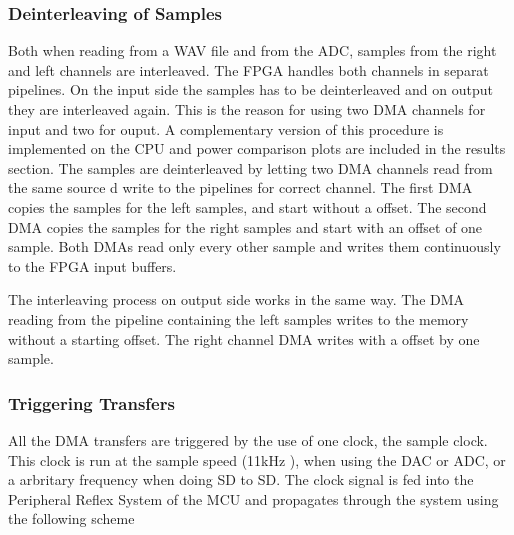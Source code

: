 \subsubsection{Deinterleaving of Samples}

Both when reading from a WAV file and from the ADC, samples from the
right and left channels are interleaved. The FPGA handles both channels in separat
pipelines. On the input side the samples has to be deinterleaved and on output they
are interleaved again. This is the reason for using two DMA channels for input and 
two for ouput. A complementary version of this procedure is implemented on the CPU 
and power comparison plots are included in the results section.  
The samples are deinterleaved by letting two DMA channels read from the same source d write to 
the pipelines for correct channel. The first DMA copies the samples for the left samples,
and start without a offset. The second DMA copies the samples for the right samples and 
start with an offset of one sample. Both DMAs read only every other sample and writes them
continuously to the FPGA input buffers. 

The interleaving process on output side works in the same way. The DMA reading from the
pipeline containing the left samples writes to the memory without a starting offset.
The right channel DMA writes with a offset by one sample. 

\subsubsection{Triggering Transfers}

All the DMA transfers are triggered by the use of one clock, the sample clock. This
clock is run at the sample speed (11kHz ), 
when using the DAC or ADC, or a arbritary frequency when doing SD to SD. The clock 
signal is fed into the Peripheral Reflex System of the MCU and propagates through the 
system using the following scheme 

